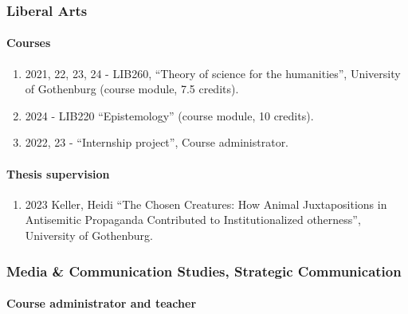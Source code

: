 \documentclass[
]{article}
\providecommand{\tightlist}{%
  \setlength{\itemsep}{0pt}\setlength{\parskip}{0pt}}
\begin{document}
\hypertarget{liberal-arts}{%
\subsubsection{Liberal Arts}\label{liberal-arts}}

\hypertarget{courses}{%
\paragraph{Courses}\label{courses}}

\begin{enumerate}
\def\labelenumi{\arabic{enumi}.}
\tightlist
\item
  2021, 22, 23, 24 - LIB260, ``Theory of science for the humanities'',
  University of Gothenburg (course module, 7.5 credits).
\item
  2024 - LIB220 ``Epistemology'' (course module, 10 credits).
\item
  2022, 23 - ``Internship project'', Course administrator.
\end{enumerate}

\hypertarget{thesis-supervision}{%
\paragraph{Thesis supervision}\label{thesis-supervision}}

\begin{enumerate}
\def\labelenumi{\arabic{enumi}.}
\tightlist
\item
  2023 Keller, Heidi ``The Chosen Creatures: How Animal Juxtapositions
  in Antisemitic Propaganda Contributed to Institutionalized
  otherness'', University of Gothenburg.
\end{enumerate}

\hypertarget{media-communication-studies-strategic-communication}{%
\subsubsection{Media \& Communication Studies, Strategic
Communication}\label{media-communication-studies-strategic-communication}}

\hypertarget{course-administrator-and-teacher-1}{%
\paragraph{Course administrator and
teacher}\label{course-administrator-and-teacher-1}}
\end{document}
